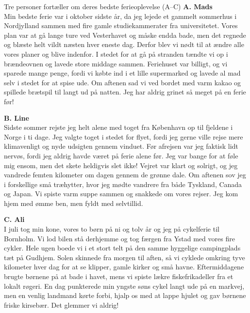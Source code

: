 \begin{emailbox}{Tre personer fortæller om deres bedste ferieoplevelse (A--C)}
\textbf{\color{NCDNavy}A. Mads}\\
Min bedste ferie var i oktober sidste år, da jeg lejede et gammelt sommerhus i Nordjylland sammen med fire gamle studiekammerater fra universitetet. Vores plan var at gå lange ture ved Vesterhavet og måske endda bade, men det regnede og blæste helt vildt næsten hver eneste dag. Derfor blev vi nødt til at ændre alle vores planer og blive indenfor. I stedet for at gå på stranden tændte vi op i brændeovnen og lavede store middage sammen. Feriehuset var billigt, og vi sparede mange penge, fordi vi købte ind i et lille supermarked og lavede al mad selv i stedet for at spise ude. Om aftenen sad vi ved bordet med varm kakao og spillede brætspil til langt ud på natten. Jeg har aldrig grinet så meget på en ferie før!

\vspace{0.45em}
\textbf{\color{NCDNavy}B. Line}\\
Sidste sommer rejste jeg helt alene med toget fra København op til fjeldene i Norge i ti dage. Jeg valgte toget i stedet for flyet, fordi jeg gerne ville rejse mere klimavenligt og nyde udsigten gennem vinduet. Før afrejsen var jeg faktisk lidt nervøs, fordi jeg aldrig havde været på ferie alene før. Jeg var bange for at føle mig ensom, men det skete heldigvis slet ikke! Vejret var klart og solrigt, og jeg vandrede femten kilometer om dagen gennem de grønne dale. Om aftenen sov jeg i forskellige små træhytter, hvor jeg mødte vandrere fra både Tyskland, Canada og Japan. Vi spiste varm suppe sammen og snakkede om vores rejser. Jeg kom hjem med ømme ben, men fyldt med selvtillid.

\vspace{0.45em}
\textbf{\color{NCDNavy}C. Ali}\\
I juli tog min kone, vores to børn på ni og tolv år og jeg på cykelferie til Bornholm. Vi lod bilen stå derhjemme og tog færgen fra Ystad med vores fire cykler. Hele ugen boede vi i et stort telt på den samme hyggelige campingplads tæt på Gudhjem. Solen skinnede fra morgen til aften, så vi cyklede omkring tyve kilometer hver dag for at se klipper, gamle kirker og små havne. Eftermiddagene brugte børnene på at bade i havet, mens vi spiste lækre fiskefrikadeller fra et lokalt røgeri. En dag punkterede min yngste søns cykel langt ude på en markvej, men en venlig landmand kørte forbi, hjalp os med at lappe hjulet og gav børnene friske kirsebær. Det glemmer vi aldrig!
\end{emailbox}

